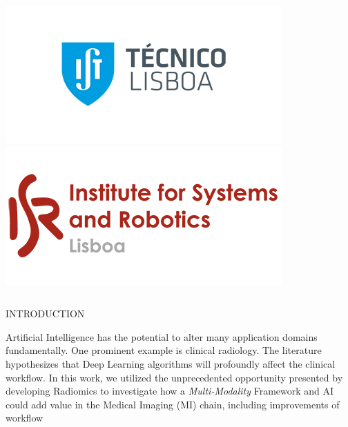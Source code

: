 \documentclass[final]{beamer}
\begin{document}
\begin{frame}[t, fragile = singleslide]{}
\begin{columns}[t]
\begin{column}{0.18\textwidth}
\flushright
\includegraphics[width = 0.8\columnwidth]{./logos/logo003}
\vspace*{\baselineskip}
\includegraphics[width = 0.8\columnwidth]{./logos/logo004}
\end{column}

\begin{column}{0.02\textwidth}
\end{column}

\end{columns}

\begin{columns}[t]

\begin{column}{0.45\textwidth}

\begin{block}{INTRODUCTION}

Artificial Intelligence has the potential to alter many application domains fundamentally. One prominent example is clinical radiology. The literature hypothesizes that Deep Learning algorithms will profoundly affect the clinical workflow. In this work, we utilized the unprecedented opportunity presented by developing Radiomics to investigate how a \textit{Multi-Modality} Framework and AI could add value in the Medical Imaging (MI) chain, including improvements of workflow %


\end{block}
\end{column}
\end{columns}
\end{frame}
\end{document}
